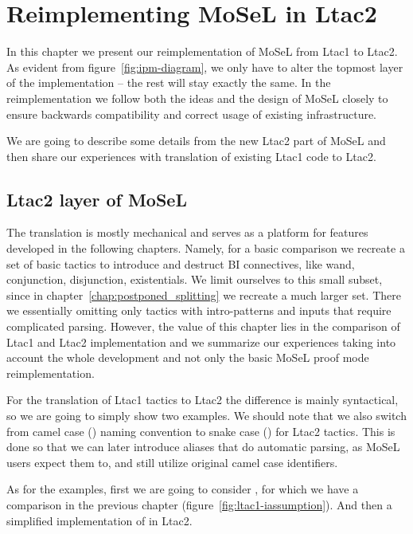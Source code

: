 \chapter{Reimplementing MoSeL in Ltac2}
\label{chap:ltac2-tactics-mosel}

In this chapter we present our reimplementation of MoSeL from Ltac1 to Ltac2.
As evident from figure~\ref{fig:ipm-diagram}, we only have to alter the topmost layer of the implementation -- the rest will stay exactly the same.
In the reimplementation we follow both the ideas and the design of MoSeL closely to ensure backwards compatibility and correct usage of existing infrastructure.

We are going to describe some details from the new Ltac2 part of MoSeL and then share our experiences with translation of existing Ltac1 code to Ltac2.

\section{Ltac2 layer of MoSeL}

The translation is mostly mechanical and serves as a platform for features developed in the following chapters.
Namely, for a basic comparison we recreate a set of basic tactics to introduce and destruct BI connectives, like wand, conjunction, disjunction, existentials.
We limit ourselves to this small subset, since in chapter~\ref{chap:postponed_splitting} we recreate a much larger set.
There we essentially omitting only tactics with intro-patterns and inputs that require complicated parsing.
However, the value of this chapter lies in the comparison of Ltac1 and Ltac2 implementation and we summarize our experiences taking into account the whole development and not only the basic MoSeL proof mode reimplementation.

For the translation of Ltac1 tactics to Ltac2 the difference is mainly syntactical, so we are going to simply show two examples.
We should note that we also switch from camel case () naming convention to snake case () for Ltac2 tactics.
This is done so that we can later introduce aliases that do automatic parsing, as MoSeL users expect them to, and still utilize original camel case identifiers.

As for the examples, first we are going to consider , for which we have a comparison in the previous chapter (figure~\ref{fig:ltac1-iassumption}).
And then a simplified implementation of  in Ltac2.


